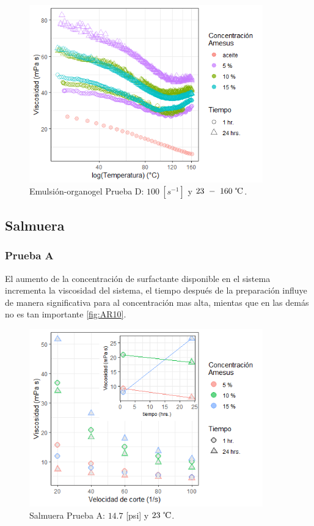     \begin{figure}[h]
        \centering
        \includegraphics[width=0.9\textwidth]{R_plot/Rplot09.png}
        \caption[Prueba D emulsión organogel]{Emulsión-organogel Prueba D: $100~[s^{-1}]$ y $23~-~160~\celsius$.}
        \label{fig:DR09}
    \end{figure}


\subsection{Salmuera}

    \subsubsection{Prueba A}
     El aumento de la concentración de surfactante disponible en el sistema incrementa la viscosidad del sistema, el tiempo después de la preparación influye de manera significativa para al concentración mas alta, mientas que en las demás no es tan importante \autoref{fig:AR10}.
    
    \begin{figure}[h]
        \centering
        \includegraphics[width=0.9\textwidth]{R_plot/Rplot10.png}
        \caption[Prueba A salmuera]{Salmuera Prueba A: $14.7$ [psi] y $23~\celsius$.}
        \label{fig:AR10}
    \end{figure}
    
